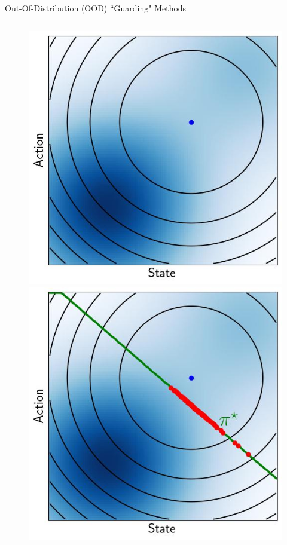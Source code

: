 \documentclass[lecture]{beamer}
\begin{document}
\begin{frame}{\normalsize Out-Of-Distribution (OOD) ``Guarding" Methods}
\begin{columns}[t]
\begin{overlayarea}{\textwidth}{0.5\textheight}
\begin{figure}
        {%
         \includegraphics[width=\FS\textwidth,clip]{Codes/Epistemic/OOD_Map.jpeg}
        }
        {%
         \includegraphics[width=\FS\textwidth,clip]{Codes/Epistemic/OOD_Star.jpeg}
}
\end{figure}
\end{overlayarea}
\end{columns}
\end{frame}
\end{document}
